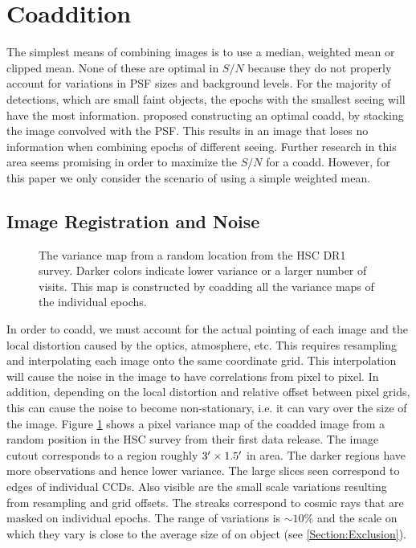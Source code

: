 \documentclass[fleqn,useAMS,usenatbib]{mnras}
\newcommand\rachel[1]{\todo[color=yellow, inline, size=\small]{Rachel: #1}}
\begin{document}
\section{Coaddition}
\label{Section:Coaddition}
The simplest means of combining images is to use a median, weighted mean or 
clipped mean.  None of these are optimal in $S/N$ because they do not properly 
account for variations in PSF sizes and background levels.  For the majority of 
detections, which are small faint objects, the epochs with the smallest seeing 
will have the most information.  \cite{Kaiser2004,Zackay2017} proposed 
constructing an optimal coadd, by stacking the image convolved with the PSF.  
This results in an image that loses no information when combining epochs of 
different seeing.  Further research in this area seems promising in order to 
maximize the $S/N$ for a coadd.  However, for this paper we only consider the 
scenario of using a simple weighted mean.  

\subsection{Image Registration and Noise}
\label{Subsection:Registration}
\begin{figure}
\caption{
The variance map from a random location from the HSC DR1 survey.  Darker colors 
indicate lower variance or a larger number of visits.  This map is constructed 
by coadding all the variance maps of the individual epochs.
\rachel{No actual figure here?}
}
\label{fig:noise}
\end{figure}

In order to coadd, we must account for the actual pointing of each image and 
the local distortion caused by the optics, atmosphere, etc.  This requires 
resampling and interpolating each image onto the same coordinate grid.  This 
interpolation will cause the noise in the image to have correlations from pixel 
to pixel.  In addition, depending on the local distortion and relative offset 
between pixel grids, this can cause the noise to become non-stationary, i.e. it 
can vary over the size of the image.  Figure \ref{fig:noise} shows a pixel 
variance map of the coadded image from a random position in the HSC survey 
\cite{HSC_DR1} from their first data release.  The image cutout corresponds to 
a region roughly $3\hbox{$^\prime$} \times 1.5\hbox{$^\prime$}$ in area.  The darker regions have 
more observations and hence lower variance.  The large slices seen correspond 
to edges of individual CCDs.  Also visible are the small scale variations 
resulting from resampling and grid offsets.  The streaks correspond to cosmic 
rays that are masked on individual epochs.  The range of variations is 
$\sim10\%$ and the scale on which they vary is close to the average size of on 
object (see \ref{Section:Exclusion}).
\end{document}
